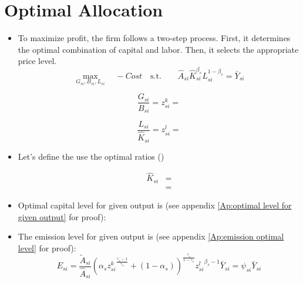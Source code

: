 \documentclass[12pt]{article} %
\begin{document}
\section*{Optimal Allocation}
\begin{itemize}
    \item To maximize profit, the firm follows a two-step process. First, it determines the optimal combination of capital and labor. Then, it selects the appropriate price level.
    \begin{equation*}
        \max_{{G_{si},B_{si},L_{si}}}  \quad
            - 		Cost \quad \text{s.t.} \quad \quad \hat{A}_{si}\hat{K}_{si}^{\beta_s} L_{si}^{1-\beta_s} = \bar{Y}_{si}
    \end{equation*}

    \begin{equation}
        {\frac{G_{si}}{B_{si}} = {z_{si}^k}} {=  }
    \end{equation}

    \begin{equation}
        {\frac{L_{si}}{\hat{K}_{si}} = {z_{si}^l}}
        { = }
    \end{equation}
  

    \item Let's define the use the optimal ratios ()
    
    \begin{equation}
        \begin{split}
            \hat{K}_{si} &= \\
            & = 
        \end{split}
        \label{eq:optimal level of K}
    \end{equation}
    \item Optimal capital level for given output is (see appendix \ref{Ap:optimal level for given output} for proof):
    

    \item The emission level for given output is (see appendix \ref{Ap:emission optimal level} for proof):
    \begin{equation}
        {E_{si} = \frac{\tilde{A}_{si}}{\hat{A}_{si}}\left(
            \alpha_s {z^k_{si}}^{\frac{\gamma_s -1}{\gamma_s}} + (1-\alpha_s)
        \right) ^ {\frac{\gamma_s}{1-\gamma_s}} {{z_{si}^l}}^{\beta_s-1} \bar{Y}_{si} }
        {= {\psi_{si}}\bar{Y}_{si}}
    \end{equation}
    

\end{itemize}
\end{document}
